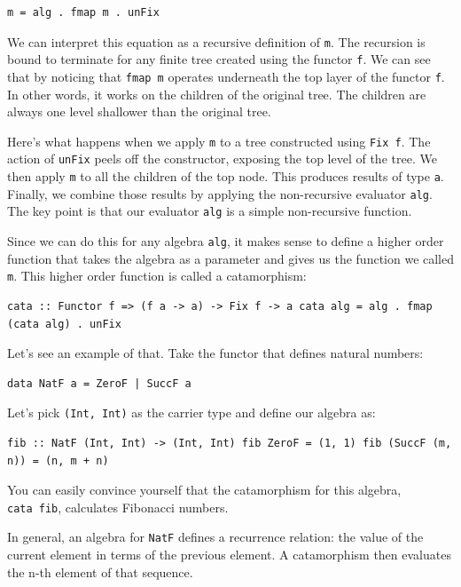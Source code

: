 \begin{verbatim}
m = alg . fmap m . unFix
\end{verbatim}

We can interpret this equation as a recursive definition of \texttt{m}.
The recursion is bound to terminate for any finite tree created using
the functor \texttt{f}. We can see that by noticing that
\texttt{fmap\ m} operates underneath the top layer of the functor
\texttt{f}. In other words, it works on the children of the original
tree. The children are always one level shallower than the original
tree.

Here's what happens when we apply \texttt{m} to a tree constructed using
\texttt{Fix\ f}. The action of \texttt{unFix} peels off the constructor,
exposing the top level of the tree. We then apply \texttt{m} to all the
children of the top node. This produces results of type \texttt{a}.
Finally, we combine those results by applying the non-recursive
evaluator \texttt{alg}. The key point is that our evaluator \texttt{alg}
is a simple non-recursive function.

Since we can do this for any algebra \texttt{alg}, it makes sense to
define a higher order function that takes the algebra as a parameter and
gives us the function we called \texttt{m}. This higher order function
is called a catamorphism:

\begin{verbatim}
cata :: Functor f => (f a -> a) -> Fix f -> a cata alg = alg . fmap (cata alg) . unFix
\end{verbatim}

Let's see an example of that. Take the functor that defines natural
numbers:

\begin{verbatim}
data NatF a = ZeroF | SuccF a
\end{verbatim}

Let's pick \texttt{(Int,\ Int)} as the carrier type and define our
algebra as:

\begin{verbatim}
fib :: NatF (Int, Int) -> (Int, Int) fib ZeroF = (1, 1) fib (SuccF (m, n)) = (n, m + n)
\end{verbatim}

You can easily convince yourself that the catamorphism for this algebra,
\texttt{cata\ fib}, calculates Fibonacci numbers.

In general, an algebra for \texttt{NatF} defines a recurrence relation:
the value of the current element in terms of the previous element. A
catamorphism then evaluates the n-th element of that sequence.

